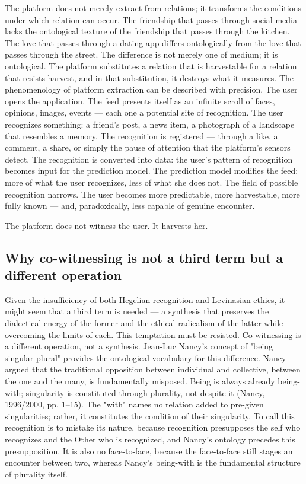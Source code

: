 The platform does not merely extract from relations; it transforms the conditions under which relation can occur. The friendship that passes through social media lacks the ontological texture of the friendship that passes through the kitchen. The love that passes through a dating app differs ontologically from the love that passes through the street. The difference is not merely one of medium; it is ontological. The platform substitutes a relation that is harvestable for a relation that resists harvest, and in that substitution, it destroys what it measures. The phenomenology of platform extraction can be described with precision. The user opens the application. The feed presents itself as an infinite scroll of faces, opinions, images, events — each one a potential site of recognition. The user recognizes something: a friend's post, a news item, a photograph of a landscape that resembles a memory. The recognition is registered — through a like, a comment, a share, or simply the pause of attention that the platform's sensors detect. The recognition is converted into data: the user's pattern of recognition becomes input for the prediction model. The prediction model modifies the feed: more of what the user recognizes, less of what she does not. The field of possible recognition narrows. The user becomes more predictable, more harvestable, more fully known — and, paradoxically, less capable of genuine encounter.

The platform does not witness the user. It harvests her.

\subsection{Why co-witnessing is not a third term but a different operation}

Given the insufficiency of both Hegelian recognition and Levinasian ethics, it might seem that a third term is needed — a synthesis that preserves the dialectical energy of the former and the ethical radicalism of the latter while overcoming the limits of each. This temptation must be resisted. Co-witnessing is a different operation, not a synthesis. Jean-Luc Nancy's concept of "being singular plural" provides the ontological vocabulary for this difference. Nancy argued that the traditional opposition between individual and collective, between the one and the many, is fundamentally misposed. Being is always already being-with; singularity is constituted through plurality, not despite it (Nancy, 1996/2000, pp. 1–15). The "with" names no relation added to pre-given singularities; rather, it constitutes the condition of their singularity. To call this recognition is to mistake its nature, because recognition presupposes the self who recognizes and the Other who is recognized, and Nancy's ontology precedes this presupposition. It is also no face-to-face, because the face-to-face still stages an encounter between two, whereas Nancy's being-with is the fundamental structure of plurality itself.

